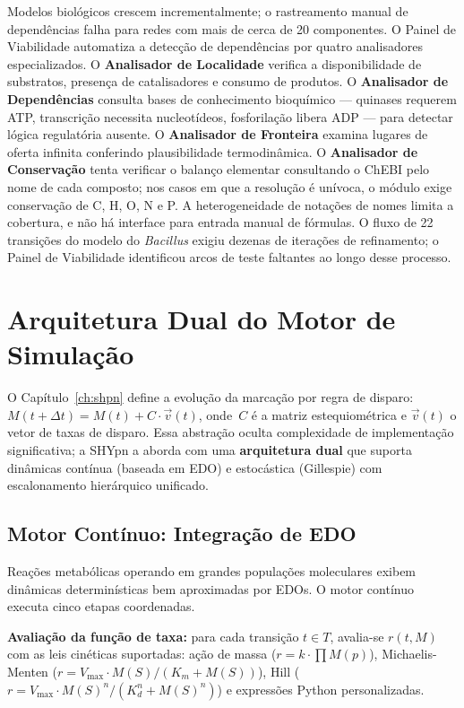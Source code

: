 Modelos biológicos crescem incrementalmente; o rastreamento manual de
dependências falha para redes com mais de cerca de 20 componentes.
O Painel de Viabilidade automatiza a detecção de dependências por quatro
analisadores especializados.
O \textbf{Analisador de Localidade} verifica a disponibilidade de substratos,
presença de catalisadores e consumo de produtos.
O \textbf{Analisador de Dependências} consulta bases de conhecimento
bioquímico — quinases requerem ATP, transcrição necessita nucleotídeos,
fosforilação libera ADP — para detectar lógica regulatória ausente.
O \textbf{Analisador de Fronteira} examina lugares de oferta infinita
conferindo plausibilidade termodinâmica.
O \textbf{Analisador de Conservação} tenta verificar o balanço elementar
consultando o ChEBI pelo nome de cada composto; nos casos em que a
resolução é unívoca, o módulo exige conservação de C, H, O, N e P.
A heterogeneidade de notações de nomes limita a cobertura, e não há
interface para entrada manual de fórmulas.
O fluxo de 22 transições do modelo do \textit{Bacillus} exigiu dezenas de
iterações de refinamento; o Painel de Viabilidade identificou
arcos de teste faltantes ao longo desse processo.

\section{Arquitetura Dual do Motor de Simulação}
\label{sec:motores-simulacao}

O Capítulo~\ref{ch:shpn} define a evolução da marcação por regra
de disparo: $M(t+\Delta t) = M(t) + C \cdot \vec{v}(t)$, onde~$C$ é a matriz
estequiométrica e $\vec{v}(t)$ o vetor de taxas de disparo.
Essa abstração oculta complexidade de implementação significativa; a SHYpn a
aborda com uma \textbf{arquitetura dual} que suporta dinâmicas contínua (baseada
em EDO) e estocástica (Gillespie) com escalonamento hierárquico unificado.

\subsection{Motor Contínuo: Integração de EDO}

Reações metabólicas operando em grandes populações moleculares exibem
dinâmicas determinísticas bem aproximadas por EDOs.
O motor contínuo executa cinco etapas coordenadas.

\textbf{Avaliação da função de taxa:} para cada transição $t \in T$, avalia-se
$r(t, M)$ com as leis cinéticas suportadas: ação de massa ($r = k \cdot \prod M(p)$),
Michaelis-Menten ($r = V_{\text{max}} \cdot M(S) / (K_m + M(S))$), Hill
($r = V_{\text{max}} \cdot M(S)^n / (K_d^n + M(S)^n)$) e expressões Python
personalizadas.

